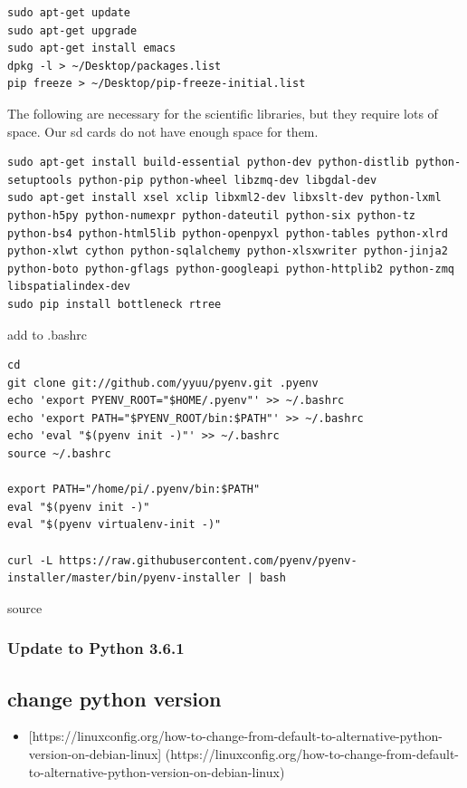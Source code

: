 \begin{verbatim}
sudo apt-get update
sudo apt-get upgrade
sudo apt-get install emacs
dpkg -l > ~/Desktop/packages.list
pip freeze > ~/Desktop/pip-freeze-initial.list
\end{verbatim}

The following are necessary for the scientific libraries, but they
require lots of space. Our sd cards do not have enough space for them.

\begin{verbatim}
sudo apt-get install build-essential python-dev python-distlib python-setuptools python-pip python-wheel libzmq-dev libgdal-dev
sudo apt-get install xsel xclip libxml2-dev libxslt-dev python-lxml python-h5py python-numexpr python-dateutil python-six python-tz python-bs4 python-html5lib python-openpyxl python-tables python-xlrd python-xlwt cython python-sqlalchemy python-xlsxwriter python-jinja2 python-boto python-gflags python-googleapi python-httplib2 python-zmq libspatialindex-dev
sudo pip install bottleneck rtree
\end{verbatim}

add to .bashrc

\begin{verbatim}
cd
git clone git://github.com/yyuu/pyenv.git .pyenv
echo 'export PYENV_ROOT="$HOME/.pyenv"' >> ~/.bashrc
echo 'export PATH="$PYENV_ROOT/bin:$PATH"' >> ~/.bashrc
echo 'eval "$(pyenv init -)"' >> ~/.bashrc
source ~/.bashrc

export PATH="/home/pi/.pyenv/bin:$PATH"
eval "$(pyenv init -)"
eval "$(pyenv virtualenv-init -)"

curl -L https://raw.githubusercontent.com/pyenv/pyenv-installer/master/bin/pyenv-installer | bash
\end{verbatim}

source

\subsubsection{Update to Python 3.6.1}\label{update-to-python-3.6.1}

\subsection{change python version}\label{change-python-version}

\begin{itemize}
\tightlist
\item
  {[}https://linuxconfig.org/how-to-change-from-default-to-alternative-python-version-on-debian-linux{]}
  (https://linuxconfig.org/how-to-change-from-default-to-alternative-python-version-on-debian-linux)
\end{itemize}


